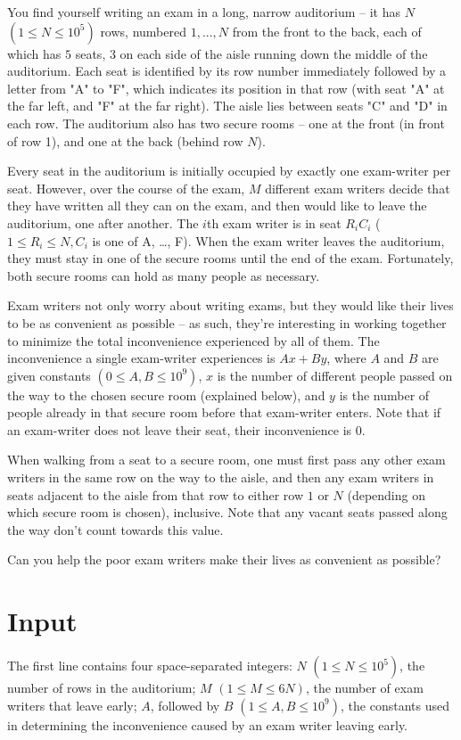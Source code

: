 
You find yourself writing an exam in a long, narrow auditorium -- it has $N$ $(1 \leq N \leq 10^5)$
rows, numbered $1, ..., N$ from the front to the back, each of which has $5$ seats, $3$ on each side
of the aisle running down the middle of the auditorium. Each seat is identified by its row number
immediately followed by a letter from "A" to "F", which indicates its position in that row (with
seat "A" at the far left, and "F" at the far right). The aisle lies between seats "C" and "D" in
each row. The auditorium also has two secure rooms -- one at the front (in front of row 1), and one
at the back (behind row $N$).

Every seat in the auditorium is initially occupied by exactly one exam-writer per seat. However,
over the course of the exam, $M$ different exam writers decide that they have written all they can
on the exam, and then would like to leave the auditorium, one after another. The $i$th exam writer
is in seat $R_iC_i$ ($1 \leq R_i \leq N, C_i$ is one of A, \ldots, F). When the exam writer leaves
the auditorium, they must stay in one of the secure rooms until the end of the exam. Fortunately,
both secure rooms can hold as many people as necessary.

Exam writers not only worry about writing exams, but they would like their lives to be as convenient
as possible -- as such, they're interesting in working together to minimize the total inconvenience
experienced by all of them. The inconvenience a single exam-writer experiences is $Ax+By$, where $A$
and $B$ are given constants $(0 \leq A,B \leq 10^9)$, $x$ is the number of different people passed
on the way to the chosen secure room (explained below), and $y$ is the number of people already in
that secure room before that exam-writer enters. Note that if an exam-writer does not leave their
seat, their inconvenience is $0$.

When walking from a seat to a secure room, one must first pass any other exam writers in the same
row on the way to the aisle, and then any exam writers in seats adjacent to the aisle from that row
to either row $1$ or $N$ (depending on which secure room is chosen), inclusive. Note that any vacant
seats passed along the way don't count towards this value.

Can you help the poor exam writers make their lives as convenient as possible?

\section*{Input}
The first line contains four space-separated integers: $N$ $(1 \leq N \leq 10^5)$, the number of rows
in the auditorium; $M$ $(1 \leq M \leq 6N)$, the number of exam writers that leave early; $A$,
followed by $B$ $(1 \leq A,B \leq 10^9)$, the constants used in determining the inconvenience caused
by an exam writer leaving early.

